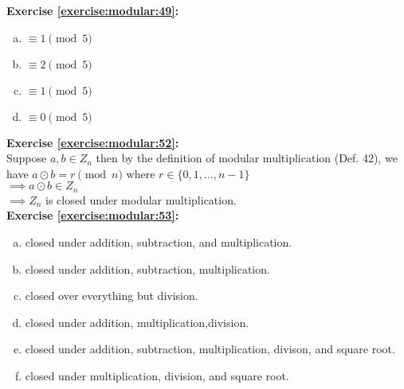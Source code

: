 \noindent\textbf{Exercise \ref{exercise:modular:49}:} 
\begin{enumerate}[(a)]
\item
$\equiv 1 \pmod{5}$

\item
$\equiv 2 \pmod{5}$

\item
$\equiv 1 \pmod{5}$

\item
$\equiv 0 \pmod{5}$
\end{enumerate}

\noindent\textbf{Exercise \ref{exercise:modular:52}:}\\
Suppose $a,b \in Z_n$ then by the definition of modular multiplication (Def. 42), we have $a \odot b =r \pmod{n}$ where $r \in \{0,1,...,n-1\}$\\
$\implies a \odot b \in Z_n$\\
$\implies Z_n$ is closed under modular multiplication.\\

\noindent\textbf{Exercise \ref{exercise:modular:53}:} 
\begin{enumerate}[(a)]
\item
closed under addition, subtraction, and multiplication.
\item
closed under addition, subtraction, multiplication.

\item
closed over everything but division.

\item
closed under addition, multiplication,division.

\item
closed under addition, subtraction, multiplication, divison, and square root.
\item
closed under multiplication, division, and square root.
\end{enumerate}

